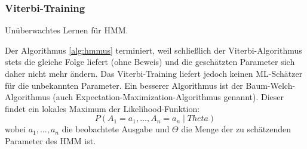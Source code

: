 \subsubsection{Viterbi-Training}
\begin{algorithm}
	\begin{algorithmic}[1]
		\Repeat
	\end{algorithmic}
	\caption{Unüberwachtes Lernen für HMM.}
	\label{alg:hmmus}
\end{algorithm}
Der Algorithmus \ref{alg:hmmus} terminiert, weil schließlich der Viterbi-Algorithmus stets die gleiche Folge liefert (ohne Beweis) und die geschätzten Parameter sich daher nicht mehr ändern.
Das Viterbi-Training liefert jedoch keinen ML-Schätzer für die unbekannten Parameter.
Ein besserer Algorithmus ist der Baum-Welch-Algorithmus (auch Ex\-pect\-ation-Maximization-Algorithmus genannt).
Dieser findet ein lokales Maximum der Likelihood-Funktion:
	\[P(A_1=a_1, \dots, A_n=a_n\mid Theta)\]
wobei \(a_1, \dots, a_n\) die beobachtete Ausgabe und \(\Theta\) die Menge der zu schätzenden Parameter des HMM ist.

